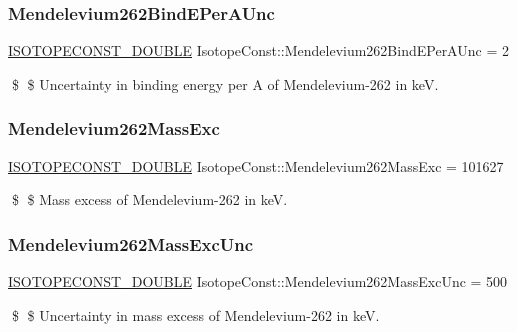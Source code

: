 \subsubsection{\texorpdfstring{Mendelevium262\+Bind\+E\+Per\+A\+Unc}{Mendelevium262BindEPerAUnc}}
{\footnotesize\ttfamily \mbox{\hyperlink{group___isotope_const-_macros_ga8f45a7272ce02c0b4c65c44636ed719a}{I\+S\+O\+T\+O\+P\+E\+C\+O\+N\+S\+T\+\_\+\+D\+O\+U\+B\+LE}} Isotope\+Const\+::\+Mendelevium262\+Bind\+E\+Per\+A\+Unc = 2}

\$ \$ Uncertainty in binding energy per A of Mendelevium-\/262 in keV. \mbox{\label{group___isotope_const-_mendelevium-_md262_ga092de479890f3eb5e3094b9acaf35b63}} 
\subsubsection{\texorpdfstring{Mendelevium262\+Mass\+Exc}{Mendelevium262MassExc}}
{\footnotesize\ttfamily \mbox{\hyperlink{group___isotope_const-_macros_ga8f45a7272ce02c0b4c65c44636ed719a}{I\+S\+O\+T\+O\+P\+E\+C\+O\+N\+S\+T\+\_\+\+D\+O\+U\+B\+LE}} Isotope\+Const\+::\+Mendelevium262\+Mass\+Exc = 101627}

\$ \$ Mass excess of Mendelevium-\/262 in keV. \mbox{\label{group___isotope_const-_mendelevium-_md262_gae49b300f49c064ab360cfe0e2ffb3b26}} 
\subsubsection{\texorpdfstring{Mendelevium262\+Mass\+Exc\+Unc}{Mendelevium262MassExcUnc}}
{\footnotesize\ttfamily \mbox{\hyperlink{group___isotope_const-_macros_ga8f45a7272ce02c0b4c65c44636ed719a}{I\+S\+O\+T\+O\+P\+E\+C\+O\+N\+S\+T\+\_\+\+D\+O\+U\+B\+LE}} Isotope\+Const\+::\+Mendelevium262\+Mass\+Exc\+Unc = 500}

\$ \$ Uncertainty in mass excess of Mendelevium-\/262 in keV. \mbox{\label{group___isotope_const-_mendelevium-_md262_ga484b087ce6d29c883e29fc7434bd7ebf}} 
